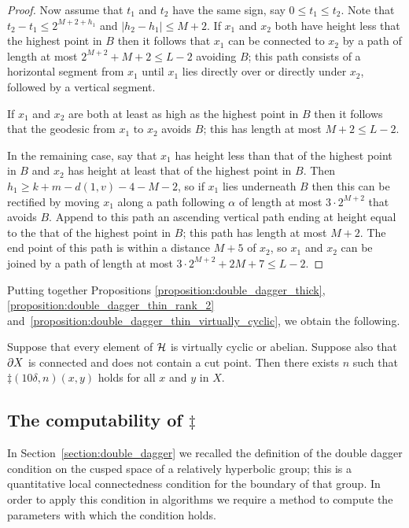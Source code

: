 \begin{proof}
  Now assume that $t_1$ and $t_2$ have the same sign, say $0 \leq t_1 \leq t_2$.
  Note that $t_2 - t_1 \leq 2^{M + 2+ h_1}$ and $|h_2 - h_1| \leq M + 2$.
  If $x_1$ and $x_2$ both have height less that the highest point in $B$ then it follows that $x_1$ can be connected to $x_2$ by a path of length at most $2^{M+2} + M+2 \leq L-2$ avoiding $B$; this path consists of a horizontal segment from $x_1$ until $x_1$ lies directly over or directly under $x_2$, followed by a vertical segment.

  If $x_1$ and $x_2$ are both at least as high as the highest point in $B$ then it follows that the geodesic from $x_1$ to $x_2$ avoids $B$; this has length at most $M+2 \leq L-2$.

  In the remaining case, say that $x_1$ has height less than that of the highest point in $B$ and $x_2$ has height at least that of the highest point in $B$.
  Then $h_1 \geq k + m - d(1,v) - 4 - M - 2$, so if $x_1$ lies underneath $B$ then this can be rectified by moving $x_1$ along a path following $\alpha$ of length at most $3\cdot 2^{M+2}$ that avoids $B$.
  Append to this path an ascending vertical path ending at height equal to the that of the highest point in $B$; this path has length at most $M+2$.
  The end point of this path is within a distance $M + 5$ of $x_2$, so $x_1$ and $x_2$ can be joined by a path of length at most $3\cdot 2^{M+2} + 2M + 7 \leq L - 2$.
\end{proof} 

Putting together Propositions \ref{proposition:double_dagger_thick}, \ref{proposition:double_dagger_thin_rank_2} and~\ref{proposition:double_dagger_thin_virtually_cyclic}, we obtain the following.

\begin{proposition}\label{proposition:double_dagger_condition_satisfied}
  Suppose that every element of $\mathcal{H}$ is virtually cyclic or abelian.
  Suppose also that $\partial X$ is connected and does not contain a cut point.
  Then there exists $n$ such that $\ddag(10\delta, n)(x,y)$ holds for all $x$ and $y$ in $X$.
\end{proposition}

\subsection{The computability of \texorpdfstring{$\ddag$}{the double dagger condition}}

In Section~\ref{section:double_dagger} we recalled the definition of the double dagger condition on the cusped space of a relatively hyperbolic group; this is a quantitative local connectedness condition for the boundary of that group.
In order to apply this condition in algorithms we require a method to compute the parameters with which the condition holds.

